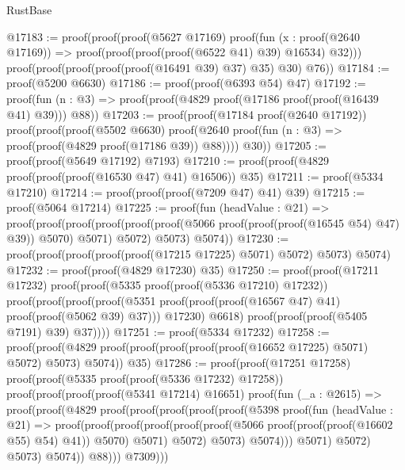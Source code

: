 \begin{lexlean}{RustBase}
\begin{coremodule}
@17183 := proof(proof(proof(@5627 @17169)
        proof(fun (x : proof(@2640 @17169)) =>
          proof(proof(proof(proof(@6522 @41) @39) @16534) @32)))
      proof(proof(proof(proof(proof(@16491 @39) @37) @35) @30) @76))
@17184 := proof(@5200 @6630)
@17186 := proof(proof(@6393 @54) @47)
@17192 := proof(fun (n : @3) => proof(proof(@4829 proof(@17186 proof(proof(@16439 @41) @39))) @88))
@17203 := proof(proof(@17184 proof(@2640 @17192))
      proof(proof(proof(@5502 @6630)
            proof(@2640 proof(fun (n : @3) => proof(proof(@4829 proof(@17186 @39)) @88))))
          @30))
@17205 := proof(proof(@5649 @17192) @7193)
@17210 := proof(proof(@4829 proof(proof(proof(@16530 @47) @41) @16506)) @35)
@17211 := proof(@5334 @17210)
@17214 := proof(proof(proof(@7209 @47) @41) @39)
@17215 := proof(@5064 @17214)
@17225 := proof(fun (headValue : @21) =>
    proof(proof(proof(proof(proof(proof(@5066 proof(proof(proof(@16545 @54) @47) @39)) @5070) @5071)
            @5072)
          @5073)
        @5074))
@17230 := proof(proof(proof(proof(proof(@17215 @17225) @5071) @5072) @5073) @5074)
@17232 := proof(proof(@4829 @17230) @35)
@17250 := proof(proof(@17211 @17232)
      proof(proof(@5335 proof(proof(@5336 @17210) @17232))
          proof(proof(proof(proof(@5351
                    proof(proof(proof(@16567 @47) @41) proof(proof(@5062 @39) @37)))
                  @17230)
                @6618)
              proof(proof(proof(@5405 @7191) @39) @37))))
@17251 := proof(@5334 @17232)
@17258 := proof(proof(@4829
        proof(proof(proof(proof(proof(@16652 @17225) @5071) @5072) @5073) @5074))
      @35)
@17286 := proof(proof(@17251 @17258)
      proof(proof(@5335 proof(proof(@5336 @17232) @17258))
          proof(proof(proof(proof(@5341 @17214) @16651)
                proof(fun (_a : @2615) =>
                  proof(proof(@4829
                        proof(proof(proof(proof(proof(@5398
                                    proof(fun (headValue : @21) =>
                                      proof(proof(proof(proof(proof(proof(@5066
                                                    proof(proof(proof(@16602 @55) @54) @41))
                                                  @5070)
                                                @5071)
                                              @5072)
                                            @5073)
                                          @5074)))
                                  @5071)
                                @5072)
                              @5073)
                            @5074))
                      @88)))
              @7309)))

\end{coremodule}
\end{lexlean}
